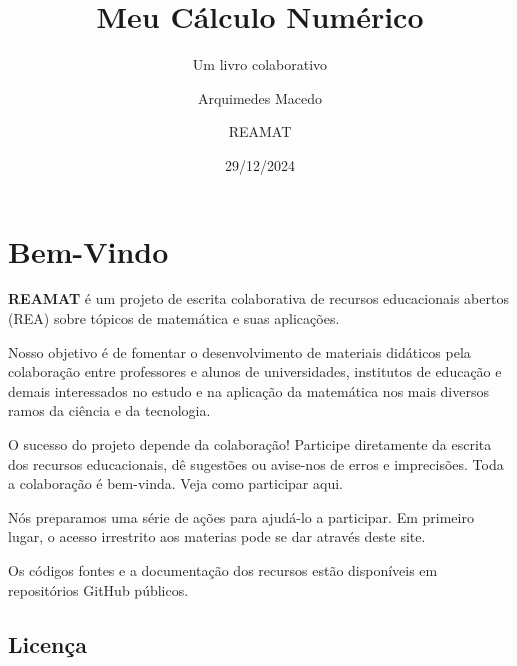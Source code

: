 \documentclass[
  a4paper,
  DIV=11,
  numbers=noendperiod,
  oneside]{scrreprt}
\title{Meu Cálculo Numérico}
\subtitle{Um livro colaborativo}
\author{Arquimedes Macedo \and REAMAT}
\date{29/12/2024}
\renewcommand*\contentsname{Índice}
\newcommand\contentsname{Índice}
\begin{document}
\maketitle

\renewcommand*\contentsname{Índice}
{
\hypersetup{linkcolor=}
\setcounter{tocdepth}{2}
\tableofcontents
}


\chapter*{Bem-Vindo}\label{bem-vindo}


\textbf{REAMAT} é um projeto de escrita colaborativa de recursos
educacionais abertos (REA) sobre tópicos de matemática e suas
aplicações.

Nosso objetivo é de fomentar o desenvolvimento de materiais didáticos
pela colaboração entre professores e alunos de universidades, institutos
de educação e demais interessados no estudo e na aplicação da matemática
nos mais diversos ramos da ciência e da tecnologia.

O sucesso do projeto depende da colaboração! Participe diretamente da
escrita dos recursos educacionais, dê sugestões ou avise-nos de erros e
imprecisões. Toda a colaboração é bem-vinda. Veja como participar aqui.

Nós preparamos uma série de ações para ajudá-lo a participar. Em
primeiro lugar, o acesso irrestrito aos materias pode se dar através
deste site.

\begin{tcolorbox}[enhanced jigsaw, breakable, left=2mm, opacityback=0, arc=.35mm, colframe=quarto-callout-note-color-frame, leftrule=.75mm, bottomrule=.15mm, rightrule=.15mm, colback=white, toprule=.15mm]
\begin{minipage}[t]{5.5mm}
\textcolor{quarto-callout-note-color}{\faInfo}
\end{minipage}%
\begin{minipage}[t]{\textwidth - 5.5mm}

Os códigos fontes e a documentação dos recursos estão disponíveis em
repositórios GitHub públicos.

\end{minipage}%
\end{tcolorbox}

\section*{Licença}\label{licenuxe7a}
\end{document}
